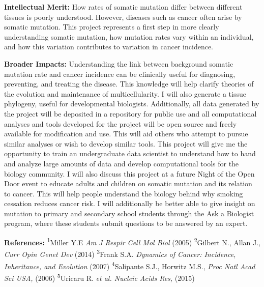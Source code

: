 \documentclass[12pt]{article}
\begin{document}
\textbf{Intellectual Merit:}
How rates of somatic mutation differ between different tissues is poorly understood. However, diseases such as cancer often arise by somatic mutation.
This project represents a first step in more clearly understanding somatic mutation, how mutation rates vary within an individual, and how this variation contributes to variation in cancer incidence.

\textbf{Broader Impacts:}
Understanding the link between background somatic mutation rate and cancer incidence can be clinically useful for diagnosing, preventing, and treating the disease. This knowledge will help clarify theories of the evolution and maintenance of multicellularity. I will also generate a tissue phylogeny, useful for developmental biologists. Additionally, all data generated by the project will be deposited in a repository for public use and all computational analyses and tools developed for the project will be open source and freely available for modification and use. This will aid others who attempt to pursue similar analyses or wish to develop similar tools. This project will give me the opportunity to train an undergraduate data scientist to understand how to hand and analyze large amounts of data and develop computational tools for the biology community. I will also discuss this project at a future Night of the Open Door event to educate adults and children on somatic mutation and its relation to cancer. This will help people understand the biology behind why smoking cessation reduces cancer risk. I will additionally be better able to give insight on mutation to primary and secondary school students through the Ask a Biologist program, where these students submit questions to be answered by an expert.

\begin{footnotesize}
\textbf{References:}
\textsuperscript{1}Miller Y.E \textit{Am J Respir Cell Mol Biol} (2005)
\textsuperscript{2}Gilbert N., Allan J., \textit{Curr Opin Genet Dev} (2014)
\textsuperscript{3}Frank S.A. \textit{Dynamics of Cancer: Incidence, Inheritance, and Evolution} (2007)
\textsuperscript{4}Salipante S.J., Horwitz M.S., \textit{Proc Natl Acad Sci USA,} (2006)
\textsuperscript{5}Uricaru R. \textit{et al. Nucleic Acids Res,} (2015)
\end{footnotesize}
\end{document}
